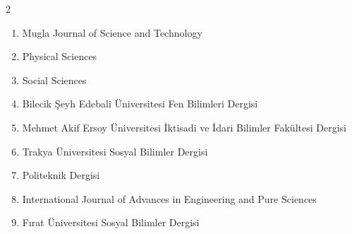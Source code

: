 \documentclass[10pt,letterpaper]{article}
\begin{document}
\begin{multicols}{2}
\begin{enumerate}
\item Mugla Journal of Science and Technology
\item Physical Sciences
\item Social Sciences
\item Bilecik Şeyh Edebali Üniversitesi Fen Bilimleri Dergisi
\item Mehmet Akif Ersoy Üniversitesi İktisadi ve İdari Bilimler Fakültesi Dergisi
\item Trakya Üniversitesi Sosyal Bilimler Dergisi
\item Politeknik Dergisi
\item International Journal of Advances in Engineering and Pure Sciences
\item Fırat Üniversitesi Sosyal Bilimler Dergisi
\end{enumerate}
\end{multicols}
\end{document}
